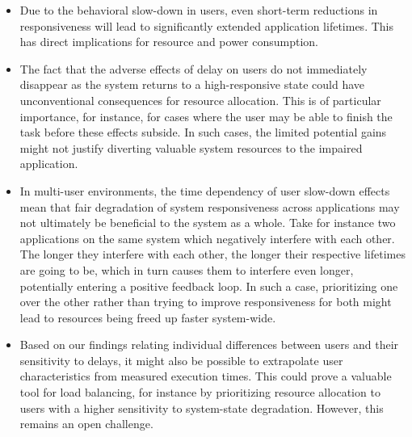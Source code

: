 \documentclass[10pt,letterpaper]{article}
\providecommand{\DIFaddbegin}{\protect\color{blue}} %
\providecommand{\DIFaddend}{\protect\color{black}} %
\providecommand{\DIFdelend}{\protect\color{black}} %
\newcommand{\DIFaddincludegraphics}[2][]{{\color{blue}\fbox{\DIFOincludegraphics[#1]{#2}}}} %
\DeclareRobustCommand{\DIFaddbegin}{\DIFOaddbegin \let\includegraphics\DIFaddincludegraphics} %
\DeclareRobustCommand{\DIFaddend}{\DIFOaddend \let\includegraphics\DIFOincludegraphics} %
\DeclareRobustCommand{\DIFdelend}{\DIFOaddend \let\includegraphics\DIFOincludegraphics} %
\begin{document}
\DIFdelend \DIFaddbegin \begin{itemize}

  \item Due to the behavioral slow-down in users, even short-term reductions in responsiveness will lead to significantly extended application lifetimes.
  This has direct implications for resource and power consumption.

  \item The fact that the adverse effects of delay on users do not immediately disappear as the system returns to a high-responsive state could have unconventional consequences for resource allocation.
  This is of particular importance, for instance, for cases where the user may be able to finish the task before these effects subside.
  In such cases, the limited potential gains might not justify diverting valuable system resources to the impaired application.

  \item In multi-user environments, the time dependency of user slow-down effects mean that fair degradation of system responsiveness across applications may not ultimately be beneficial to the system as a whole.
  Take for instance two applications on the same system which negatively interfere with each other. 
  The longer they interfere with each other, the longer their respective lifetimes are going to be, which in turn causes them to interfere even longer, potentially entering a positive feedback loop. 
  In such a case, prioritizing one over the other rather than trying to improve responsiveness for both might lead to resources being freed up faster system-wide.

  \item Based on our findings relating individual differences between users and their sensitivity to delays, it might also be possible to extrapolate user characteristics from measured execution times.
  This could prove a valuable tool for load balancing, for instance by prioritizing resource allocation to users with a higher sensitivity to system-state degradation.
  However, this remains an open challenge.

\end{itemize}
\DIFaddend 
\end{document}
